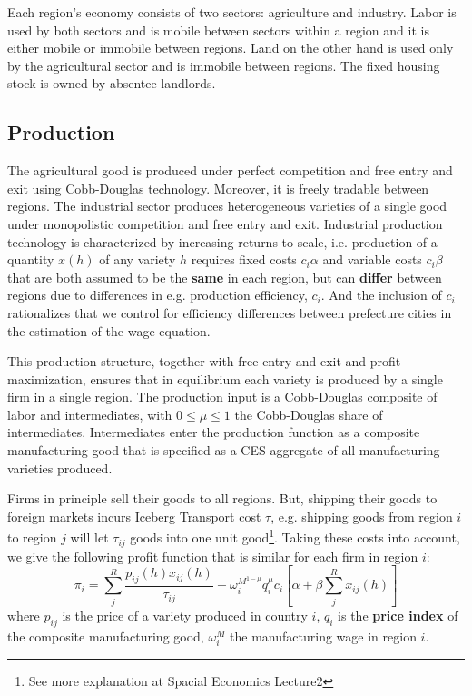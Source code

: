 \documentclass[twocolumn]{article}
\begin{document}
Each region's economy consists of two sectors: agriculture and industry. Labor is used by both sectors and is mobile between sectors within a region and it is either mobile or immobile between regions. Land on the other hand is used only by the agricultural sector and is immobile between regions. The fixed housing stock is owned by absentee landlords. 


\subsection{Production}

The agricultural good is produced under perfect competition and free entry and exit using Cobb-Douglas technology. Moreover, it is freely tradable between regions. The industrial sector produces heterogeneous varieties of a single good under monopolistic competition and free entry and exit. Industrial production technology is characterized by increasing returns to scale, i.e. production of a quantity $x(h)$ of any variety $ h $ requires fixed costs $c_i \alpha$ and variable costs $c_i \beta $ that are both assumed to be the \textbf{same} in each region, but can \textbf{differ} between regions due to differences in e.g. production efficiency, $c_i$. And the inclusion of $c_i$ rationalizes that we control for efficiency differences between prefecture cities in the estimation of the wage equation. 

This production structure, together with free entry and exit and profit maximization, ensures that in equilibrium each variety is produced by a single firm in a single region. The production input is a Cobb-Douglas composite of labor and intermediates, with $0 \leq \mu \leq 1$ the Cobb-Douglas share of intermediates. Intermediates enter the production function as a composite manufacturing good that is specified as a CES-aggregate of all manufacturing varieties produced.

Firms in principle sell their goods to all regions. But, shipping their goods to foreign markets incurs Iceberg Transport cost $\tau$, e.g. shipping goods from region $i$ to region $j$ will let $\tau_{ij}$ goods into one unit good\footnote{See more explanation at Spacial Economics Lecture2}. Taking these costs into account, we give the following profit function that is similar for each firm in region $i$:
\begin{equation}
    \pi_i = \sum^R_j \frac{p_{ij}(h) x_{ij}(h)}{\tau_{ij}} - \omega_i^{M^{1-\mu}} q_i^{\mu} c_i[\alpha + \beta \sum^R_j x_{ij}(h)]
\end{equation}
where $p_{ij}$ is the price of a variety produced in country $i$, $q_i$ is the \textbf{price index} of the composite manufacturing good, $\omega_i^{M}$ the manufacturing wage in region $i$.
\end{document}

